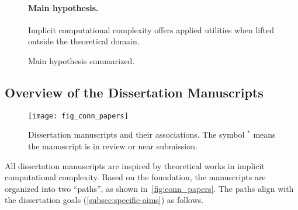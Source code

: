 \begin{figure}[t]
\begin{mdframed}
\paragraph*{Main hypothesis.}
Implicit computational complexity offers applied utilities when lifted outside the theoretical domain.
\end{mdframed}
\caption[Main hypothesis summarized]
{Main hypothesis summarized.}
\label{fig:hypothesis}
\end{figure}

\subsection{Overview of the Dissertation Manuscripts}
\label{subsec:conn-papers}

\begin{figure}[p]
\texttt{[image: fig\_conn\_papers]}\vspace{1em}
\caption[Dissertation manuscripts and their associations]
{Dissertation manuscripts and their associations.
The symbol $^*$ means the manuscript is in review or near submission.}
\label{fig:conn_papers}
\end{figure}

All dissertation manuscripts are inspired by theoretical works in implicit computational complexity.
Based on the foundation, the manuscripts are organized into two \enquote{paths}, as shown in~\autoref{fig:conn_papers}.
The paths align with the dissertation goals (\autoref{subsec:specific-aims}) as follows.

